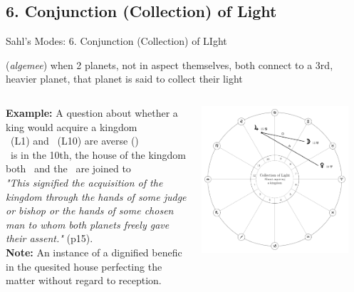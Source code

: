 \subsection{6. Conjunction (Collection) of Light}
\begin{frame}[t]{Sahl's Modes: 6. Conjunction (Collection) of LIght}
\begin{description}[style=nextline]
\item[6. Collection of Light] (\textsl{algemee}) when 2 planets, not in aspect themselves, both connect to a 3rd, heavier planet, that planet is said to collect their light

\begin{columns}[T, onlytextwidth]
\textbf{Example:} A question about whether a king would acquire a kingdom \\
\ul
\Venus\ (L1) and \Moon\ (L10) are averse (\Semisextile) \\
\Jupiter\ is in the 10th, the house of the kingdom \\
both \Venus\ and the \Moon\ are joined to \Jupiter \\
\vspace{0.25cm}
\textsl{"This signified the acquisition of the kingdom through the hands of some judge or bishop or the hands of some chosen man to whom both planets freely gave their assent."} (p15). \\
\vspace{0.25cm}
\textbf{Note:} An instance of a dignified benefic in the quesited house perfecting the matter without regard to reception.
\vspace{-0.5cm}
\begin{center}
{\includegraphics[width=0.9\textwidth]{charts/61-collection}} \\
\end{center}
\end{columns}
\end{description}
\end{frame}
